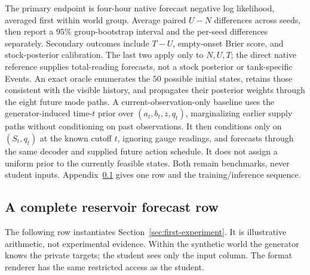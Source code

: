 \documentclass[10pt]{article}
\begin{document}
The primary endpoint is four-hour native forecast negative log likelihood,
averaged first within world group. Average paired $U-N$ differences across
seeds, then report a $95\%$ group-bootstrap interval and the per-seed
differences separately. Secondary outcomes include $T-U$, empty-onset Brier
score, and stock-posterior calibration. The last two apply only to $N,U,T$;
the direct native reference supplies total-reading forecasts, not a stock
posterior or tank-specific Events.
An exact oracle enumerates the $50$ possible initial states, retains those
consistent with the visible history, and propagates their posterior weights
through the eight future mode paths. A current-observation-only baseline uses
the generator-induced time-$t$ prior over $(a_t,b_t,z,q_t)$, marginalizing
earlier supply paths without conditioning on past observations. It then
conditions only on $(S_t,q_t)$ at the known cutoff $t$, ignoring gauge readings,
and forecasts through the same decoder and supplied future action schedule.
It does not assign a uniform prior to the currently feasible states. Both
remain benchmarks, never student inputs. Appendix~\ref{app:reservoir-row} gives
one row and the training/inference sequence.

\subsection{A complete reservoir forecast row}
\label{app:reservoir-row}

The following row instantiates Section~\ref{sec:first-experiment}. It is
illustrative arithmetic, not experimental evidence. Within the synthetic
world the generator knows the private targets; the student sees only the
input column. The format renderer has the same restricted access as the
student.
\end{document}
